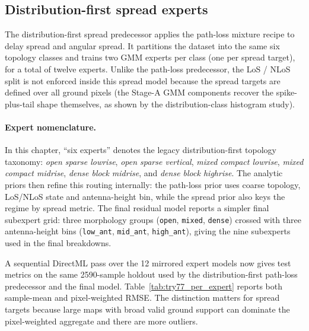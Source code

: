 \subsection{Distribution-first spread experts}

The distribution-first spread predecessor applies the path-loss mixture recipe to delay spread and
angular spread. It partitions the dataset into the same six topology
classes and trains two GMM experts per class (one per spread target),
for a total of twelve experts. Unlike the path-loss predecessor, the LoS / NLoS split is
not enforced inside this spread model because the spread targets are defined over
all ground pixels (the Stage-A GMM components recover the
spike-plus-tail shape themselves, as shown by the distribution-class
histogram study).

\paragraph{Expert nomenclature.}
In this chapter, ``six experts'' denotes the legacy distribution-first
topology taxonomy:
\emph{open sparse lowrise}, \emph{open sparse vertical},
\emph{mixed compact lowrise}, \emph{mixed compact midrise},
\emph{dense block midrise}, and \emph{dense block highrise}.
The analytic priors then refine this routing internally: the path-loss prior uses
coarse topology, LoS/NLoS state and antenna-height bin, while the spread prior
also keys the regime by spread metric. The final residual model reports a simpler final
subexpert grid: three morphology groups (\texttt{open}, \texttt{mixed},
\texttt{dense}) crossed with three antenna-height bins
(\texttt{low\_ant}, \texttt{mid\_ant}, \texttt{high\_ant}), giving the
nine subexperts used in the final breakdowns.

A sequential DirectML pass over the 12 mirrored expert models now gives
test metrics on the same 2590-sample holdout used by the distribution-first path-loss predecessor and the final model.
Table~\ref{tab:try77_per_expert} reports both sample-mean and
pixel-weighted RMSE. The distinction matters for spread targets because
large maps with broad valid ground support can dominate the pixel-weighted
aggregate and there are more outliers.

